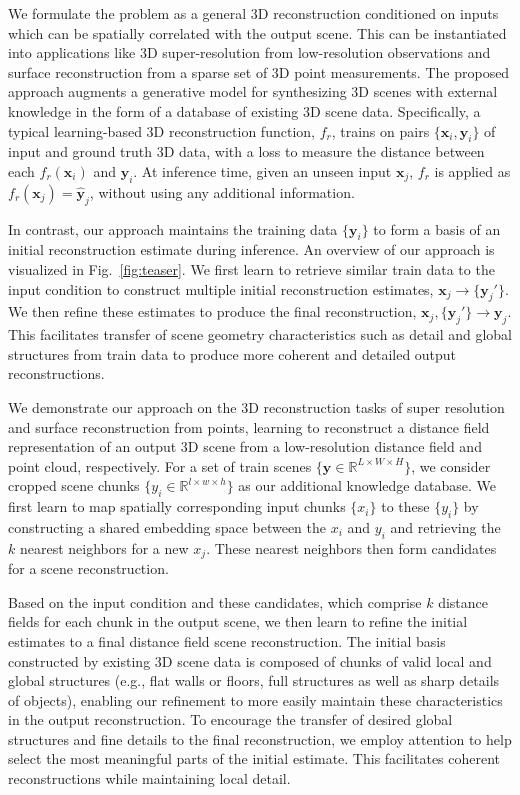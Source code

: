 We formulate the problem as a general 3D reconstruction conditioned on inputs which can be spatially correlated with the output scene. This can be instantiated into applications like 3D super-resolution from low-resolution observations and surface reconstruction from a sparse set of 3D point measurements. 
The proposed approach augments a generative model for synthesizing 3D scenes with external knowledge in the form of a database of existing 3D scene data. 
Specifically, a typical learning-based 3D reconstruction function, $f_r$, trains on pairs $\{\mathbf{x}_i, \mathbf{y}_i\}$ of input and ground truth 3D data, with a loss to measure the distance between each $f_r(\mathbf{x}_i)$ and $\mathbf{y}_i$. 
At inference time, given an unseen input $\mathbf{x}_j$, $f_r$ is applied as $f_r(\mathbf{x}_j) = \hat{\mathbf{y}}_j$, without using any additional information. 

In contrast, our approach maintains the training data $\{\mathbf{y}_i\}$ to form a basis of an initial reconstruction estimate during inference. 
An overview of our approach is visualized in Fig.~\ref{fig:teaser}.
We first learn to retrieve similar train data to the input condition to construct multiple initial reconstruction estimates, $\mathbf{x}_j\rightarrow \{\mathbf{y}_j'\}$. 
We then refine these estimates to produce the final reconstruction, $\mathbf{x}_j,\{\mathbf{y}_j'\} \rightarrow \mathbf{y}_j$. 
This facilitates transfer of scene geometry characteristics such as detail and global structures from train data to produce more coherent and detailed output reconstructions.

We demonstrate our approach on the 3D reconstruction tasks of super resolution and surface reconstruction from points, learning to reconstruct a distance field representation of an output 3D scene from a low-resolution distance field and point cloud, respectively. 
For a set of train scenes $\{\mathbf{y} \in \mathbb{R}^{L \times W \times H}\}$, we consider cropped scene chunks $\{y_i \in \mathbb{R}^{l \times w \times h}\}$ as our additional knowledge database. 
We first learn to map spatially corresponding input chunks $\{x_i\}$ to these $\{y_i\}$ by constructing a shared embedding space between the $x_i$ and $y_i$ and retrieving the $k$ nearest neighbors for a new $x_j$. These nearest neighbors then form candidates for a scene reconstruction.

Based on the input condition and these candidates, which comprise $k$ distance fields for each chunk in the output scene, we then learn to refine the initial estimates to a final distance field scene reconstruction.
The initial basis constructed by existing 3D scene data is composed of chunks of valid local and global structures (e.g., flat walls or floors, full structures as well as sharp details of objects), enabling our refinement to more easily maintain these characteristics in the output reconstruction.
To encourage the transfer of desired global structures and fine details to the final reconstruction, we employ attention to help select the most meaningful parts of the initial estimate.
This facilitates coherent reconstructions while maintaining local detail. 


